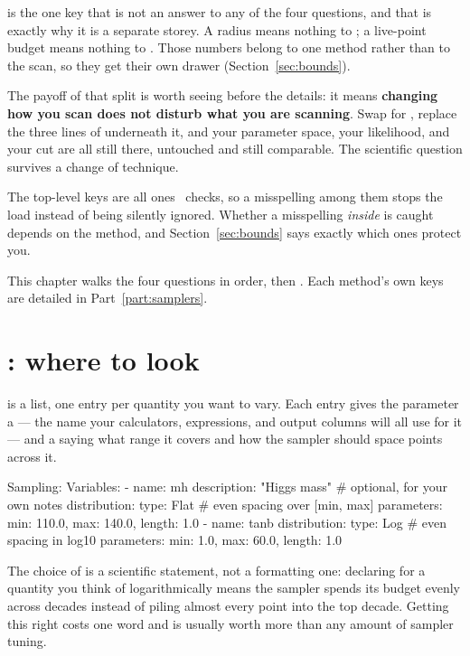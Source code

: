  is the one key that is not an answer to any of the four questions, and
that is exactly why it is a separate storey. A radius means nothing to ; a
live-point budget means nothing to . Those numbers belong to one method
rather than to the scan, so they get their own drawer (Section~\ref{sec:bounds}).

The payoff of that split is worth seeing before the details: it means \textbf{changing
how you scan does not disturb what you are scanning}. Swap  for
, replace the three lines of  underneath it, and
your parameter space, your likelihood, and your cut are all still there, untouched and
still comparable. The scientific question survives a change of technique.

The top-level keys are all ones \Jtwo\ checks, so a misspelling among them stops the load
instead of being silently ignored. Whether a misspelling \emph{inside} 
is caught depends on the method, and Section~\ref{sec:bounds} says exactly which ones
protect you.

This chapter walks the four questions in order, then . Each method's own
keys are detailed in Part~\ref{part:samplers}.

\section{: where to look}
\label{sec:sampling-variables}

 is a list, one entry per quantity you want to vary. Each entry gives
the parameter a  --- the name your calculators, expressions, and output
columns will all use for it --- and a  saying what range it covers
and how the sampler should space points across it.

\begin{yamlwin}
Sampling:
  Variables:
    - name: mh
      description: "Higgs mass"     # optional, for your own notes
      distribution:
        type: Flat                  # even spacing over [min, max]
        parameters: {min: 110.0, max: 140.0, length: 1.0}
    - name: tanb
      distribution:
        type: Log                   # even spacing in log10
        parameters: {min: 1.0, max: 60.0, length: 1.0}
\end{yamlwin}

The choice of  is a scientific statement, not a formatting one: declaring
 for a quantity you think of logarithmically means the sampler spends its
budget evenly across decades instead of piling almost every point into the top decade.
Getting this right costs one word and is usually worth more than any amount of sampler
tuning.

